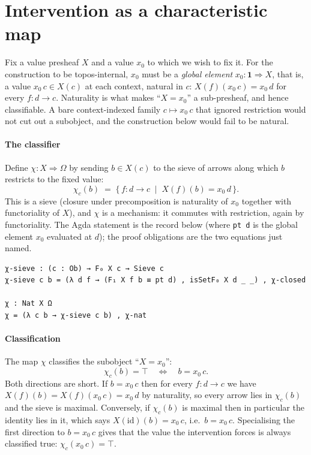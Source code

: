 \documentclass{lmcs}
\newcommand{\Om}{\Omega}
\begin{document}
\section{Intervention as a characteristic map}\label{sec:classifier}

Fix a value presheaf $X$ and a value $x_0$ to which we wish to fix it.
For the construction to be topos-internal, $x_0$ must be a \emph{global element} $x_0 : \mathbf{1} \Rightarrow X$, that is, a value $x_0\,c \in X(c)$ at each context, natural in $c$: $X(f)(x_0\,c) = x_0\,d$ for every $f : d \to c$.
Naturality is what makes ``$X = x_0$'' a sub-presheaf, and hence classifiable.
A bare context-indexed family $c \mapsto x_0\,c$ that ignored restriction would not cut out a subobject, and the construction below would fail to be natural.

\paragraph{The classifier}
Define $\chi : X \Rightarrow \Om$ by sending $b \in X(c)$ to the sieve of arrows along which $b$ restricts to the fixed value:
\[ \chi_c(b) \;=\; \{\, f : d \to c \;\mid\; X(f)(b) = x_0\,d \,\}. \]
This is a sieve (closure under precomposition is naturality of $x_0$ together with functoriality of $X$), and $\chi$ is a mechanism: it commutes with restriction, again by functoriality. The Agda statement is the record below (where \texttt{pt d} is the global element $x_0$ evaluated at $d$); the proof obligations are the two equations just named.
\begin{lstlisting}
χ-sieve : (c : Ob) → F₀ X c → Sieve c
χ-sieve c b = (λ d f → (F₁ X f b ≡ pt d) , isSetF₀ X d _ _) , χ-closed

χ : Nat X Ω
χ = (λ c b → χ-sieve c b) , χ-nat
\end{lstlisting}

\paragraph{Classification}
The map $\chi$ classifies the subobject ``$X = x_0$'':
\[ \chi_c(b) = \top \quad\Longleftrightarrow\quad b = x_0\,c. \]
Both directions are short.
If $b = x_0\,c$ then for every $f : d \to c$ we have $X(f)(b) = X(f)(x_0\,c) = x_0\,d$ by naturality, so every arrow lies in $\chi_c(b)$ and the sieve is maximal.
Conversely, if $\chi_c(b)$ is maximal then in particular the identity lies in it, which says $X(\mathrm{id})(b) = x_0\,c$, i.e.\ $b = x_0\,c$.
Specialising the first direction to $b = x_0\,c$ gives that the value the intervention forces is always classified true: $\chi_c(x_0\,c) = \top$.
\end{document}
